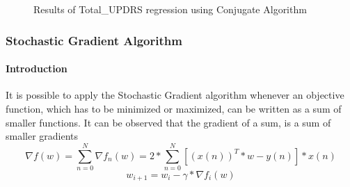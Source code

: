 \documentclass[12pt,a4paper,oneside]{article}
\begin{document}
\begin{figure}[p]
		 \\
		\\
		\caption{Results of Total\_UPDRS regression using Conjugate Algorithm}
		\label{fig:Figure 5}
	\end{figure}
	
	\subsubsection{Stochastic Gradient Algorithm}
	\paragraph{Introduction}
	It is possible to apply the Stochastic Gradient algorithm whenever an objective function, which has to be minimized or maximized, can be written as a sum of smaller functions.
	It can be observed that the gradient of a sum, is a sum of smaller gradients
	\begin{equation}
	\nabla f(w)=\sum_{n=0}^{N}\nabla f_{n}(w)=2*\sum_{n=0}^{N}[(x(n))^{T}*w-y(n)]*x(n)
	\end{equation}   
	\begin{equation}
		w_{i+1}=w_{i}-\gamma*\nabla f_{i}(w)
	\end{equation}
	
\end{document}
